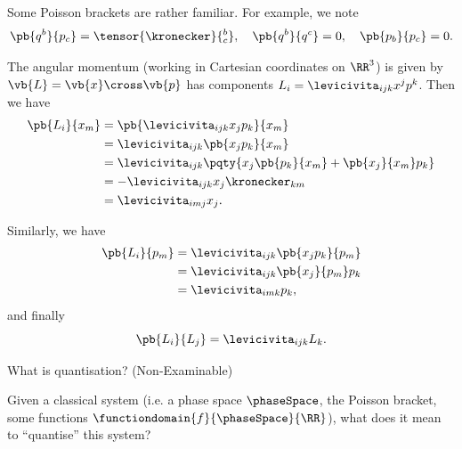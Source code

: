Some Poisson brackets are rather familiar. For example, we note
\begin{equation}
    \pb{q^b}{p_c} = \tensor{\kronecker}{^b_c}, \quad \pb{q^b}{q^c} = 0, \quad \pb{p_b}{p_c} = 0.
\end{equation}

The angular momentum (working in Cartesian coordinates on \(\RR^3\)) is given by \(\vb{L} = \vb{x} \cross \vb{p}\) has components \(L_i = \levicivita_{ijk} x^j p^k\). Then we have
\begin{subequations}
    \begin{align}
         \pb{L_i}{x_m} &= \pb{\levicivita_{ijk} x_j p_k}{x_m} \\
         &= \levicivita_{ijk} \pb{x_j p_k}{x_m} \\
         &= \levicivita_{ijk} \pqty{x_j \pb{p_k}{x_m} + \pb{x_j}{x_m} p_k} \\
         &= - \levicivita_{ijk} x_j \kronecker_{km} \\
         &= \levicivita_{imj} x_j.
    \end{align}
\end{subequations}

Similarly, we have
\begin{subequations}
    \begin{align}
        \pb{L_i}{p_m} &= \levicivita_{ijk} \pb{x_j p_k}{p_m} \\
        &= \levicivita_{ijk} \pb{x_j}{p_m} p_k \\
        &= \levicivita_{imk} p_k,
    \end{align}
\end{subequations}
and finally
\begin{equation}
    \pb{L_i}{L_j} = \levicivita_{ijk} L_k.
\end{equation}

\small

What is quantisation? (Non-Examinable)

Given a classical system (i.e. a phase space \(\phaseSpace\), the Poisson bracket, some functions \(\functiondomain{f}{\phaseSpace}{\RR}\)), what does it mean to ``quantise'' this system?

